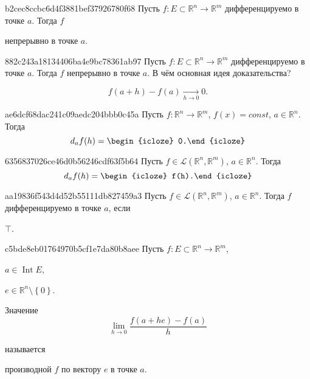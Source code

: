 \begin{note}{b2cec8ccbc6d4f3881bef37926780f68}
    Пусть \({ f : E \subset \mathbb R^{n} \to \mathbb R^{m} }\) дифференцируемо в точке \({ a }\).
    Тогда \({ f }\) \begin{icloze}{1}непрерывно в точке \({ a }\).\end{icloze}
\end{note}

\begin{note}{882c243a18134406ba4e9bc78361ab97}
    Пусть \({ f : E \subset \mathbb R^{n} \to \mathbb R^{m} }\) дифференцируемо в точке \({ a }\).
    Тогда \({ f }\) непрерывно в точке \({ a }\).
    В чём основная идея доказательства?

    \begin{cloze}{1}
        \[
            f(a + h) - f(a) \underset{h \to 0}\longrightarrow 0.
        \]
    \end{cloze}
\end{note}

\begin{note}{ae6dcf68dac241c09aedc204bbb0c45a}
    Пусть \({ f : \mathbb R^{n} \to \mathbb R^{m} }\),\: \({ f(x) = const }\),\: \({ a \in \mathbb R^{n} }\).
    Тогда
    \[
        d_{a} f(h) = \begin{icloze}{1}0.\end{icloze}
    \]
\end{note}

\begin{note}{6356837026ce46d0b56246cdf63f5b64}
    Пусть \({ f \in \mathcal L(\mathbb R^{n}, \mathbb R^{m}) }\),\: \({ a \in \mathbb R^{n} }\).
    Тогда
    \[
        d_{a} f(h) = \begin{icloze}{1}f(h).\end{icloze}
    \]
\end{note}

\begin{note}{aa19836f543d4d52b55111db827459a3}
    Пусть \({ f \in \mathcal L(\mathbb R^{n}, \mathbb R^{m}) }\),\: \({ a \in \mathbb R^{n} }\).
    Тогда \({ f }\) дифференцируемо в точке \({ a }\), если \begin{icloze}{1}\({ \top }\).\end{icloze}
\end{note}

\begin{note}{c5bde8eb01764970b5cf1e7da80b8aee}
    Пусть \({ f : E \subset \mathbb R^{n} \to \mathbb R^{m} }\), \begin{icloze}{4}\({ a \in \operatorname{Int} E }\),\end{icloze}\: \begin{icloze}{3}\({ e \in \mathbb R^{n} \setminus \left\{ 0 \right\} }\).\end{icloze}
    \begin{icloze}{1}
        Значение
        \[
            \lim_{h \to 0} \frac{f(a + he) - f(a)}{h}
        \]
    \end{icloze}
    называется \begin{icloze}{2}производной \({ f }\) по вектору \({ e }\) в точке \({ a }\).\end{icloze}
\end{note}


